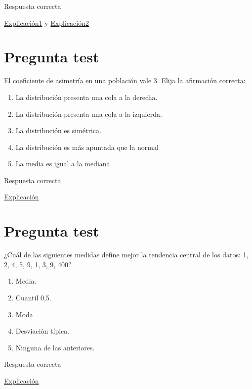 \documentclass[
]{book}
\providecommand{\tightlist}{%
  \setlength{\itemsep}{0pt}\setlength{\parskip}{0pt}}
\begin{document}
Respuesta correcta

\href{https://1fjmanzano.github.io/bioestadistica/medidas-de-forma.html}{Explicación1} y \href{https://www.statisticshowto.com/what-is-a-bimodal-distribution/}{Explicación2}

\hypertarget{pregunta-test-85}{%
\section{Pregunta test}\label{pregunta-test-85}}

El coeficiente de asimetría en una población vale 3. Elija la afirmación correcta:

\begin{enumerate}
\def\labelenumi{\alph{enumi})}
\tightlist
\item
  La distribución presenta una cola a la derecha.
\item
  La distribución presenta una cola a la izquierda.
\item
  La distribución es simétrica.
\item
  La distribución es más apuntada que la normal
\item
  La media es igual a la mediana.
\end{enumerate}

Respuesta correcta

\href{https://1fjmanzano.github.io/bioestadistica/medidas-de-forma.html}{Explicación}

\hypertarget{pregunta-test-86}{%
\section{Pregunta test}\label{pregunta-test-86}}

¿Cuál de las siguientes medidas define mejor la tendencia central de los datos: 1, 2, 4, 5, 9, 1, 3, 9, 400?

\begin{enumerate}
\def\labelenumi{\alph{enumi})}
\tightlist
\item
  Media.
\item
  Cuantil 0,5.
\item
  Moda
\item
  Desviación típica.
\item
  Ninguna de las anteriores.
\end{enumerate}

Respuesta correcta

\href{https://1fjmanzano.github.io/bioestadistica/medidas-de-posicio\%CC\%81n-dispersio\%CC\%81n-y-forma.html\#medidas-de-posicio\%CC\%81n-no-centrales}{Explicación}
\end{document}
